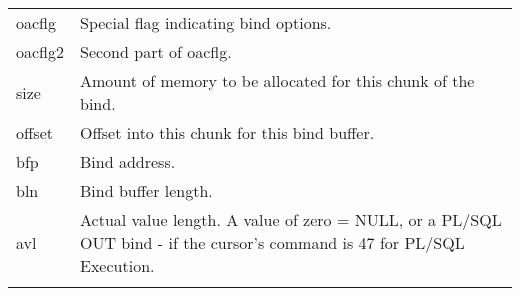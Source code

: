 \begin{longtable}[]{@{}l|l@{}}
\begin{minipage}[t]{0.14\columnwidth}
oacflg\strut
\end{minipage} & \begin{minipage}[t]{0.65\columnwidth}\raggedright\strut
Special flag indicating bind options.\strut
\end{minipage}\tabularnewline
\begin{minipage}[t]{0.14\columnwidth}\raggedright\strut
oacflg2\strut
\end{minipage} & \begin{minipage}[t]{0.65\columnwidth}\raggedright\strut
Second part of oacflg.\strut
\end{minipage}\tabularnewline
\begin{minipage}[t]{0.14\columnwidth}\raggedright\strut
size\strut
\end{minipage} & \begin{minipage}[t]{0.65\columnwidth}\raggedright\strut
Amount of memory to be allocated for this chunk of the bind.\strut
\end{minipage}\tabularnewline
\begin{minipage}[t]{0.14\columnwidth}\raggedright\strut
offset\strut
\end{minipage} & \begin{minipage}[t]{0.65\columnwidth}\raggedright\strut
Offset into this chunk for this bind buffer.\strut
\end{minipage}\tabularnewline
\begin{minipage}[t]{0.14\columnwidth}\raggedright\strut
bfp\strut
\end{minipage} & \begin{minipage}[t]{0.65\columnwidth}\raggedright\strut
Bind address.\strut
\end{minipage}\tabularnewline
\begin{minipage}[t]{0.14\columnwidth}\raggedright\strut
bln\strut
\end{minipage} & \begin{minipage}[t]{0.65\columnwidth}\raggedright\strut
Bind buffer length.\strut
\end{minipage}\tabularnewline
\begin{minipage}[t]{0.14\columnwidth}\raggedright\strut
avl\strut
\end{minipage} & \begin{minipage}[t]{0.65\columnwidth}\raggedright\strut
Actual value length. A value of zero = NULL, or a PL/SQL OUT bind - if
the cursor's command is 47 for PL/SQL Execution.\strut
\end{minipage}\tabularnewline
\begin{minipage}[t]{0.14\columnwidth}\raggedright\strut

\end{minipage}
\end{longtable}
